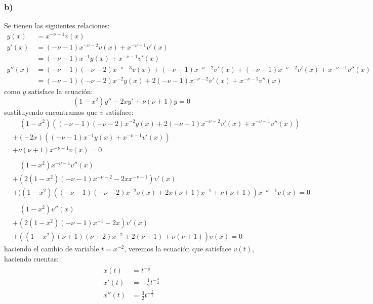 \documentclass{article}
\begin{document}
\begin{tcolorbox}[breakable]
    \subsubsection*{b)}
        Se tienen las siguientes relaciones:
        \begin{align*}
            y(x) &= x^{-\nu-1}v(x) \\
            y'(x) 
            &= (-\nu-1)x^{-\nu-2}v(x) + x^{-\nu-1}v'(x) \\
            &= (-\nu-1)x^{-1}y(x) + x^{-\nu-1}v'(x) \\
            y''(x) 
            &= (-\nu-1)(-\nu-2)x^{-\nu-3}v(x) + (-\nu-1)x^{-\nu-2}v'(x) + (-\nu-1)x^{-\nu-2}v'(x) + x^{-\nu-1}v''(x) \\
            &= (-\nu-1)(-\nu-2)x^{-2}y(x) + 2(-\nu-1)x^{-\nu-2}v'(x) + x^{-\nu-1}v''(x)
        \end{align*}
        como $y$ satisface la ecuación:
        \[ (1-x^2)y''-2xy'+ \nu(\nu+1)y=0 \]
        sustituyendo encontramos que $v$ satisface:
        \begin{align*}
            &\quad (1-x^2)((-\nu-1)(-\nu-2)x^{-2}y(x) + 2(-\nu-1)x^{-\nu-2}v'(x) + x^{-\nu-1}v''(x)) \\
            &+ (-2x)((-\nu-1)x^{-1}y(x) + x^{-\nu-1}v'(x)) \\
            &+ \nu(\nu+1)x^{-\nu-1}v(x) = 0 \\ \\ 
            &\quad (1-x^2)x^{-\nu-1}v''(x) \\
            &+(2(1-x^2)(-\nu-1)x^{-\nu-2}-2xx^{-\nu-1})v'(x) \\
            &+ ((1-x^2)((-\nu-1)(-\nu-2)x^{-2}v(x) + 2x(\nu+1)x^{-1} + \nu(\nu+1))x^{-\nu-1}v(x) = 0 \\ \\
            &\quad (1-x^2)v''(x) \\
            &+(2(1-x^2)(-\nu-1)x^{-1} - 2x)v'(x) \\
            &+ ((1-x^2)(\nu+1)(\nu+2)x^{-2} + 2(\nu+1) + \nu(\nu+1))v(x) = 0 
        \end{align*}
        haciendo el cambio de variable $t=x^{-2}$, veremos la ecuación que satisface $v(t)$, haciendo cuentas:
        \begin{align*}
            x(t) &= t^{-\frac{1}{2}} \\
            x'(t) &= -\frac{1}{2}t^{-\frac{3}{2}} \\ 
            x''(t) &= \frac{3}{2}t^{-\frac{5}{2}} \\

\end{align*}
\end{tcolorbox}
\end{document}

